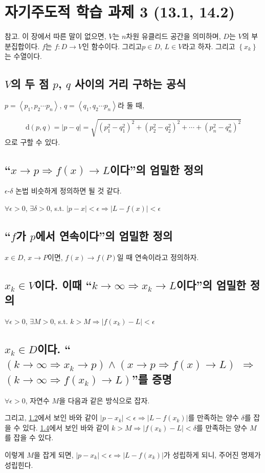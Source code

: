 \chapter{자기주도적 학습 과제 3 (13.1, 14.2)}
참고. 이 장에서 따른 말이 없으면, $V$는 $n$차원 유클리드 공간을 의미하며, $D$는 $V$의 부분집합이다.
$f$는 $f: D \to V$인 함수이다. 그리고$p \in D$, $L \in V$라고 하자.
그리고 $\left\{ x_k \right\}$는 수열이다.

\section{$V$의 두 점 $p$, $q$ 사이의 거리 구하는 공식}

$p = \left\langle p_1, p_2 \cdots p_n \right\rangle$, $q = \left\langle q_1, q_2 \cdots p_n \right\rangle$라 둘 때,

$$\mathrm{d}(p,q) =  |p-q| = \sqrt{\left(p_1^2 - q_1^2\right)^2 + \left(p_2^2 - q_2^2\right)^2 + \cdots + \left(p_n^2 - q_n^2\right)^2 }$$으로 구할 수 있다.


\section{``$x \to p \Rightarrow f(x) \to L$이다''의 엄밀한 정의}  \label{chap:imt}
$\epsilon$-$\delta$ 논법 비슷하게 정의하면 될 것 같다.

$\forall \epsilon > 0$, $\exists \delta > 0$, s.t. $|p-x|< \epsilon \Rightarrow |L - f(x)| < \epsilon$

\section{``$f$가 $p$에서 연속이다''의 엄밀한 정의}
$x \in D$, $x \to P$이면, $f(x) \to f(P)$일 때 연속이라고 정의하자.

\section{$x_k \in V$이다. 이때 “$k \to \infty \Rightarrow x_k \to L$이다”의 엄밀한 정의}  \label{chap:inf}

$\forall \epsilon > 0$, $\exists M > 0$, s.t. $k > M \Rightarrow |f(x_k)-L| < \epsilon$

\section{ $x_k \in D$이다. ``$( k \to \infty \Rightarrow x_k \to p ) \land ( x \to p \Rightarrow f(x) \to L)$ $\Rightarrow$ $(k \to \infty \Rightarrow f(x_k) \to L)$''를 증명}

$\forall \epsilon > 0$,  자연수 $M$을 다음과 같은 방식으로 잡자.

그리고, \ref{chap:imt}\sectionname 에서 보인 바와 같이 $|p-x_k|< \epsilon \Rightarrow |L - f(x_k)|$를 만족하는 양수 $\delta$를 잡을 수 있다.
\ref{chap:inf}\sectionname 에서 보인 바와 같이 $k > M \Rightarrow |f(x_k)-L| < \delta$를 만족하는 양수 $M$를 잡을 수 있다.

이렇게 $M$을 잡게 되면, $|p-x_k|< \epsilon \Rightarrow |L - f(x_k)|$가 성립하게 되니, 
주어진 명제가 성립힌다.

